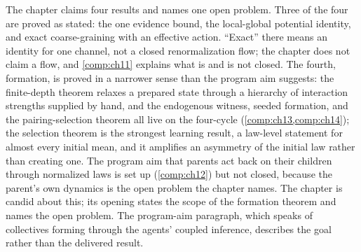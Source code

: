 \begin{verdictbox}{\PARTIAL}
The chapter claims four results and names one open problem. Three of the four are proved as stated:
the one evidence bound, the local-global potential identity, and exact coarse-graining with an
effective action. ``Exact'' there means an identity for one channel, not a closed renormalization
flow; the chapter does not claim a flow, and \cref{comp:ch11} explains what is and is not closed. The
fourth, formation, is proved in a narrower sense than the program aim suggests: the finite-depth
theorem relaxes a prepared state through a hierarchy of interaction strengths supplied by hand, and
the endogenous witness, seeded formation, and the pairing-selection theorem all live on the
four-cycle (\cref{comp:ch13,comp:ch14}); the selection theorem is the strongest learning result, a
law-level statement for almost every initial mean, and it amplifies an asymmetry of the initial law
rather than creating one. The program aim
that parents act back on their children through normalized laws is set up (\cref{comp:ch12}) but not
closed, because the parent's own dynamics is the open problem the chapter names. The chapter is
candid about this; its opening states the scope of the formation theorem and names the open problem.
The program-aim paragraph, which speaks of collectives forming through the agents' coupled inference,
describes the goal rather than the delivered result.
\end{verdictbox}
